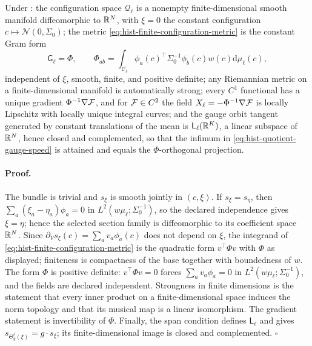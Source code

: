 Under : the configuration space
$\mathcal Q_\ell$ is a nonempty finite-dimensional smooth manifold
diffeomorphic to $\mathbb R^N$, with $\xi=0$ the constant configuration
$c\mapsto\mathcal N(0,\Sigma_0)$; the metric
\eqref{eq:hist-finite-configuration-metric} is the constant Gram form
\begin{equation}
\mathsf G_\ell=\Phi,
\qquad
\Phi_{ab}
=\int_{\mathcal C_\ell}\phi_a(c)^\top\Sigma_0^{-1}\phi_b(c)w(c)
\mathrm d\mu_\ell(c),
\label{eq:hist-configuration-gram}
\end{equation}
independent of $\xi$, smooth, finite, and positive definite; any Riemannian
metric on a finite-dimensional manifold is automatically
strong; every $C^1$ functional has a unique gradient $\Phi^{-1}\nabla\mathcal F$,
and for $\mathcal F\in C^2$ the field $X_\ell=-\Phi^{-1}\nabla\mathcal F$ is locally
Lipschitz with locally unique integral curves; and the gauge orbit tangent
generated by constant translations of the mean is
$\mathsf L_\ell(\mathbb R^K)$, a linear subspace of $\mathbb R^N$, hence closed and
complemented, so that the infimum in
\eqref{eq:hist-quotient-gauge-speed} is attained and equals the
$\Phi$-orthogonal projection.  

\paragraph{Proof.}
The bundle is trivial and $s_\xi$ is smooth jointly in $(c,\xi)$.  If
$s_\xi=s_\eta$, then $\sum_a(\xi_a-\eta_a)\phi_a=0$ in
$L^2(w\mu_\ell;\Sigma_0^{-1})$, so the declared independence gives
$\xi=\eta$; hence the selected section family is diffeomorphic to its
coefficient space $\mathbb R^N$.  Since $\partial_Vs_\xi(c)=\sum_av_a\phi_a(c)$ does not
depend on $\xi$, the integrand of
\eqref{eq:hist-finite-configuration-metric} is the quadratic form
$v^\top\Phi v$ with $\Phi$ as displayed; finiteness is compactness of the base
together with boundedness of $w$.  The form $\Phi$ is positive definite:
$v^\top\Phi v=0$ forces $\sum_av_a\phi_a=0$ in
$L^2(w\mu_\ell;\Sigma_0^{-1})$, and the fields are declared independent.
Strongness in finite dimensions is the statement that every inner product on a
finite-dimensional space induces the norm topology and that its musical map is
a linear isomorphism.  The gradient statement is invertibility of $\Phi$.
Finally, the span condition defines $\mathsf L_\ell$ and gives
$s_{\Theta^\ell_g(\xi)}=g\cdot s_\xi$; its finite-dimensional image is closed
and complemented.
$\square$

